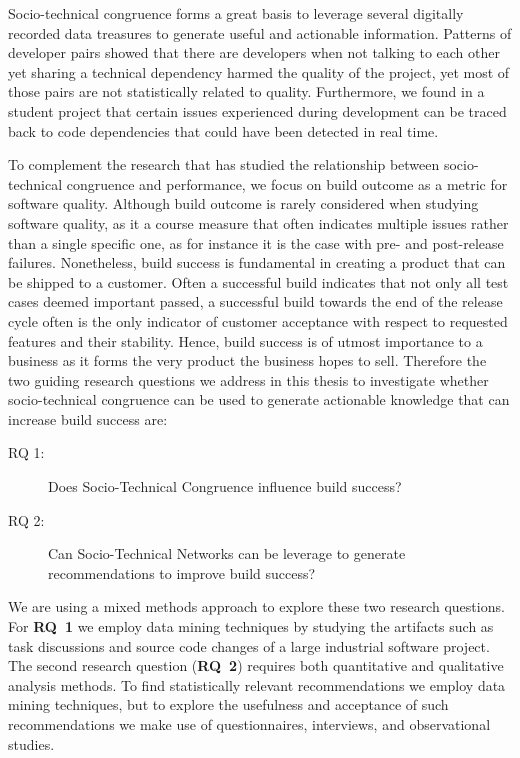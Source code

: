 Socio-technical congruence forms a great basis to leverage several digitally recorded data treasures to generate useful and actionable information.
Patterns of developer pairs showed that there are developers when not talking to each other yet sharing a technical dependency harmed the quality of the project, yet most of those pairs are not statistically related to quality.
Furthermore, we found in a student project that certain issues experienced during development can be traced back to code dependencies that could have been detected in real time.

To complement the research that has studied the relationship between socio-technical congruence and performance, we focus on build outcome as a metric for software quality.
Although build outcome is rarely considered when studying software quality, as it a course measure that often indicates multiple issues rather than a single specific one, as for instance it is the case with pre- and post-release failures.
Nonetheless,  build success is fundamental in creating a product that can be shipped to a customer.
Often a successful build indicates that not only all test cases deemed important passed, a successful build towards the end of the release cycle often is the only indicator of customer acceptance with respect to requested features and their stability.
Hence, build success is of utmost importance to a business as it forms the very product the business hopes to sell.
Therefore the two guiding research questions we address in this thesis to investigate whether socio-technical congruence can be used to generate actionable knowledge that can increase build success are:
\begin{description}
\item[RQ 1:] Does Socio-Technical Congruence influence build success?
\item[RQ 2:] Can Socio-Technical Networks can be leverage to generate recommendations to improve build success?
\end{description}

We are using a mixed methods approach to explore these two research questions.
For \textbf{RQ~1} we employ data mining techniques by studying the artifacts such as task discussions and source code changes of a large industrial software project.
The second research question (\textbf{RQ~2}) requires both quantitative and qualitative analysis methods.
To find statistically relevant recommendations we employ data mining techniques, but to explore the usefulness and acceptance of such recommendations we make use of questionnaires, interviews, and observational studies.


